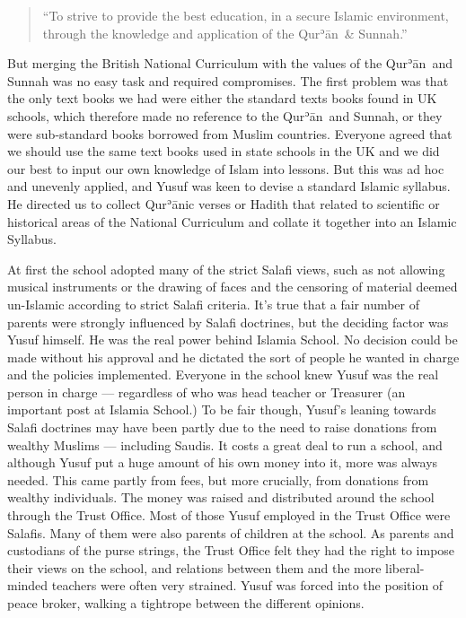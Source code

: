 \documentclass[12pt]{memoir}
\def\´{ʾ} %
\newcommand{\cor}[2]{#2} %
\def \Quran{Qur\-\´ān} %
\def\–{-\hskip0pt}
\begin{document}
\begin{quote}
“To strive to provide the best education, in a secure Islamic environment,
through the knowledge and application of the \Quran\ \& Sunnah.”
\end{quote}

But merging the British National Curriculum with the values of
the \Quran\ and Sunnah was no easy task and required compromises.
The first problem was that the only text books we had were either
the standard texts books found in UK schools,
which therefore made no reference to the \Quran\ and Sunnah,
or they were sub\–standard books borrowed from Muslim countries.
Everyone agreed that we should use the same text books
used in \cor{State Schools}{state schools} in the UK and we did our best
to input our own knowledge of Islam into lessons.
But this was ad hoc and unevenly applied,
and Yusuf was keen to devise a standard Islamic syllabus.
He directed us to collect \Quran{}ic verses or Hadith
that related to scientific or historical areas of the National Curriculum
and collate it together into an Islamic Syllabus.

At first the school adopted many of the strict Salafi views,
such as not allowing musical instruments or the drawing of faces
and the censoring of material deemed un-Islamic
according to strict Salafi criteria.
It’s true that a fair number of parents were strongly influenced
by Salafi doctrines, but the deciding factor was Yusuf himself.
He was the real power behind Islamia School.
No decision could be made without his approval and he dictated
the sort of people he wanted in charge and the policies implemented.
Everyone in the school knew Yusuf was the real person in charge —
regardless of who was head teacher or Treasurer
(an important post at Islamia School.)
To be fair though, Yusuf’s leaning towards Salafi doctrines
may have been partly due to the need
to raise donations from wealthy Muslims — including Saudis.
It costs a great deal to run a school,
and although Yusuf put a huge amount of his own money into it,
more was always needed.
This came partly from fees, but more crucially,
from donations from wealthy individuals.
The money was raised and distributed around the school
through the Trust Office.
Most of those Yusuf employed in the Trust Office were Salafis.
Many of them were also parents of children at the school.
As parents and custodians of the purse strings,
the Trust Office felt they had the right to impose their views on the school,
and relations between them and the more liberal-minded teachers
were often very strained.
Yusuf was forced into the position of peace broker,
walking a tightrope between the different opinions.
\end{document}
